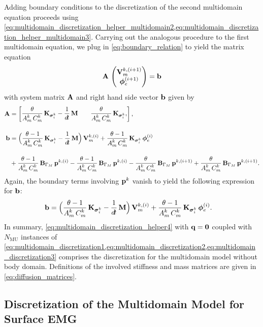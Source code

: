 Adding boundary conditions to the discretization of the second multidomain equation proceeds using \cref{eq:multidomain_discretization_helper_multidomain2,eq:multidomain_discretization_helper_multidomain3}.
Carrying out the analogous procedure to the first multidomain equation, we plug in \cref{eq:boundary_relation} to yield the matrix equation
\begin{align}\label{eq:multidomain_discretization1}
  \textbf{A}\,\left(\begin{matrix}\textbf{V}_m^{k,(i+1)}\\ \boldsymbol{\phi}_{e}^{(i+1)}\end{matrix}\right) = \textbf{b}
\end{align}
%
with system matrix $\textbf{A}$ and right hand side vector $\textbf{b}$ given by
%
\begin{align}
 \bfA &= \matt{
    \dfrac{\theta}{A_m^k\,C_m^k}\bfK_{\bfsigma_i^k} -\dfrac{1}{\dt}\bfM & \quad
    \dfrac{\theta}{A_m^k\,C_m^k}\bfK_{\bfsigma_i^k},
  },\label{eq:multidomain_discretization2} \\[4mm]
  \bfb &= \Big( \dfrac{\theta-1}{A_m^k\,C_m^k}\bfK_{\bfsigma_i^k} - \dfrac{1}{\dt}\bfM\Big)\,\bfV_m^{k,(i)} 
    + \dfrac{\theta - 1}{A_m^k\,C_m^k}\bfK_{\bfsigma_i^k}\,\bfphi_e^{(i)}\nonumber \\[4mm]
  & +\dfrac{\theta-1}{A_m^k\,C_m^k}\bfB_{\Gamma_M}\,\bfp^{k,(i)} - \dfrac{\theta-1}{A_m^k\,C_m^k}\bfB_{\Gamma_M}\,\bfp^{k,(i)}
  -\dfrac{\theta}{A_m^k\,C_m^k}\bfB_{\Gamma_M}\,\bfp^{k,(i+1)} + \dfrac{\theta}{A_m^k\,C_m^k}\bfB_{\Gamma_M}\,\bfp^{k,(i+1)}.\nonumber 
\end{align}
Again, the boundary terms involving $\textbf{p}^k$ vanish to yield the following expression for $\textbf{b}$:%
\begin{align}\label{eq:multidomain_discretization3}
    \bfb &= \Big( \dfrac{\theta-1}{A_m^k\,C_m^k}\bfK_{\bfsigma_i^k} - \dfrac{1}{\dt}\bfM\Big)\,\bfV_m^{k,(i)} 
      + \dfrac{\theta - 1}{A_m^k\,C_m^k}\bfK_{\bfsigma_i^k}\,\bfphi_e^{(i)}.
\end{align}
In summary, \cref{eq:multidomain_discretization_helper4} with $\textbf{q}=\textbf{0}$ coupled with $N_\text{MU}$  instances of \cref{eq:multidomain_discretization1,eq:multidomain_discretization2,eq:multidomain_discretization3} comprises the discretization for the multidomain model without body domain. Definitions of the involved stiffness and mass matrices are given in \cref{eq:diffusion_matrices}.

\subsection{Discretization of the Multidomain Model for Surface EMG}\label{sec:discretization_body_domain}

